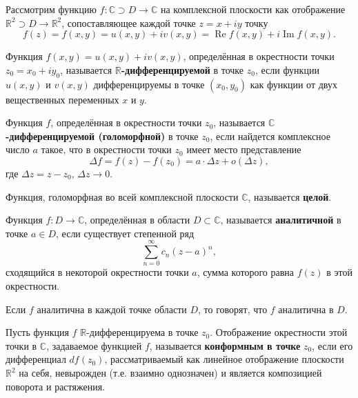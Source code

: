 Рассмотрим функцию $f: \mathbb{C}\supset D \to \mathbb{C}$ на комплексной плоскости как отображение $\mathbb{R}^2\supset D \to \mathbb{R}^2$, сопоставляющее каждой точке $z = x + iy$ точку
\[
f(z) = f(x, y) = u(x, y) + i v(x, y) = \operatorname{Re} f(x, y) + i \operatorname{Im} f(x, y).
\]

\begin{definition}
Функция $f(x, y) = u(x, y) + i v(x, y)$, определённая в окрестности точки $z_0 = x_0 + i y_0$, называется \textbf{$\mathbb{R}$-дифференцируемой} в точке $z_0$, если функции $u(x, y)$ и $v(x, y)$ дифференцируемы в точке $(x_0, y_0)$ как функции от двух вещественных переменных $x$ и $y$.
\end{definition}

\begin{definition}
Функция $f$, определённая в окрестности точки $z_0$, называется \textbf{$\mathbb{C}$-дифференцируемой (голоморфной)} в точке $z_0$, если найдется комплексное число $a$ такое, что в окрестности точки $z_0$ имеет место представление
\[
\Delta f = f(z) - f(z_0) = a \cdot \Delta z + o(\Delta z),
\]
где $\Delta z = z - z_0$, $\Delta z\to 0$.
\end{definition}

\begin{definition}
Функция, голоморфная во всей комплексной плоскости $\mathbb{C}$, называется \textbf{целой}.
\end{definition}

\begin{definition}
Функция $f: D \to \mathbb{C}$, определённая в области $D \subset \mathbb{C}$, называется \textbf{аналитичной} в точке $a \in D$, если существует степенной ряд
\[
\sum_{n=0}^{\infty} c_n (z - a)^n,
\]
сходящийся в некоторой окрестности точки $a$, сумма которого равна $f(z)$ в этой окрестности.

Если $f$ аналитична в каждой точке области $D$, то говорят, что $f$ аналитична в $D$.
\end{definition}

\begin{definition}
Пусть функция $f$ $\mathbb{R}$-дифференцируема в точке $z_0$. Отображение окрестности этой точки в $\mathbb{C}$, задаваемое функцией $f$, называется \textbf{конформным в точке} $z_0$, если его дифференциал $df(z_0)$, рассматриваемый как линейное отображение плоскости $\mathbb{R}^2$ на себя, невырожден (т.е. взаимно однозначен) и является композицией поворота и растяжения.
\end{definition}

